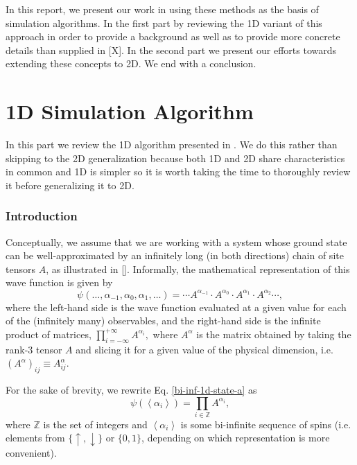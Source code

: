 \documentclass{article}
\newcommand{\seq}[1]{\left<#1\right>}
\newcommand{\Z}{\mathbb{Z}}
\begin{document}
In this report, we present our work in using these methods as the basis of simulation algorithms.  In the first part by reviewing the 1D variant of this approach in order to provide a background as well as to provide more concrete details than supplied in [X].  In the second part we present our efforts towards extending these concepts to 2D.  We end with a conclusion.

\part{1D Simulation Algorithm}
\label{1dsim}

In this part we review the 1D algorithm presented in \cite{Crosswhite2008}.  We do this rather than skipping to the 2D generalization because both 1D and 2D share characteristics in common and 1D is simpler so it is worth taking the time to thoroughly review it before generalizing it to 2D.

\section{Introduction}

Conceptually, we assume that we are working with a system whose ground state can be well-approximated by an infinitely long (in both directions) chain of site tensors $A$, as illustrated in [].  Informally, the mathematical representation of this wave function is given by
\begin{equation}
\label{bi-inf-1d-state-a}
\psi(\dots,\alpha_{-1},\alpha_{0},\alpha_1,\dots)= \cdots A^{\alpha_{-1}} \cdot A^{\alpha_0}\cdot A^{\alpha_1}\cdot A^{\alpha_2} \cdots,
\end{equation}
where the left-hand side is the wave function evaluated at a given value for each of the (infinitely many) observables, and the right-hand side is the infinite product of matrices, $\prod_{i=-\infty}^{+\infty} A^{\alpha_i},$ where $A^{\alpha}$ is the matrix obtained by taking the rank-3 tensor $A$ and slicing it for a given value of the physical dimension, i.e. $(A^\alpha)_{ij}\equiv A^\alpha_{ij}$.

For the sake of brevity, we rewrite Eq. \ref{bi-inf-1d-state-a} as
\begin{equation}
\label{bi-inf-1d-state-b}
\psi(\seq{\alpha_i}) = \prod_{i\in\Z} A^{\alpha_i},
\end{equation}
where $\Z$ is the set of integers and $\seq{\alpha_i}$ is some bi-infinite sequence of spins (i.e. elements from $\{\uparrow,\downarrow\}$ or $\{0,1\}$, depending on which representation is more convenient).
\end{document}
